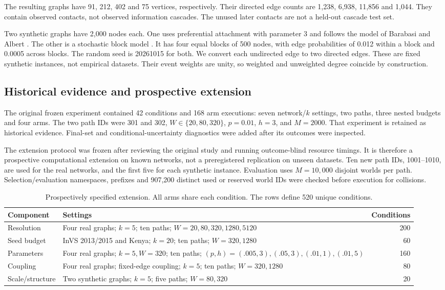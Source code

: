 The resulting graphs have 91, 212, 402 and 75 vertices, respectively. Their directed edge counts are 1,238, 6,938, 11,856 and 1,044. They contain observed contacts, not observed information cascades. The unused later contacts are not a held-out cascade test set.

Two synthetic graphs have 2,000 nodes each. One uses preferential attachment with parameter 3 and follows the model of Barabasi and Albert \cite{ref17}. The other is a stochastic block model \cite{ref18}. It has four equal blocks of 500 nodes, with edge probabilities of 0.012 within a block and 0.0005 across blocks. The random seed is 20261015 for both. We convert each undirected edge to two directed edges. These are fixed synthetic instances, not empirical datasets. Their event weights are unity, so weighted and unweighted degree coincide by construction.

\subsection{Historical evidence and prospective extension}
The original frozen experiment contained 42 conditions and 168 arm executions: seven network/$k$ settings, two paths, three nested budgets and four arms. The two path IDs were 301 and 302, $W\in\{20,80,320\}$, $p=0.01$, $h=3$, and $M=2000$. That experiment is retained as historical evidence. Final-set and conditional-uncertainty diagnostics were added after its outcomes were inspected.

The extension protocol was frozen after reviewing the original study and running outcome-blind resource timings. It is therefore a prospective computational extension on known networks, not a preregistered replication on unseen datasets. Ten new path IDs, 1001--1010, are used for the real networks, and the first five for each synthetic instance. Evaluation uses $M=10,000$ disjoint worlds per path. Selection/evaluation namespaces, prefixes and 907,200 distinct used or reserved world IDs were checked before execution for collisions.

\begin{table}[t]
\caption{Prospectively specified extension. All arms share each condition. The rows define 520 unique conditions.}\label{tab:matrix}
\begin{tabularx}{\linewidth}{lXr}
\toprule
Component & Settings & Conditions \\
\midrule
Resolution & Four real graphs; $k=5$; ten paths; $W=20,80,320,1280,5120$ & 200 \\
Seed budget & InVS 2013/2015 and Kenya; $k=20$; ten paths; $W=320,1280$ & 60 \\
Parameters & Four real graphs; $k=5,W=320$; ten paths; $(p,h)=(.005,3),(.05,3),(.01,1),(.01,5)$ & 160 \\
Coupling & Four real graphs; fixed-edge coupling; $k=5$; ten paths; $W=320,1280$ & 80 \\
Scale/structure & Two synthetic graphs; $k=5$; five paths; $W=80,320$ & 20 \\
\bottomrule
\end{tabularx}
\end{table}

